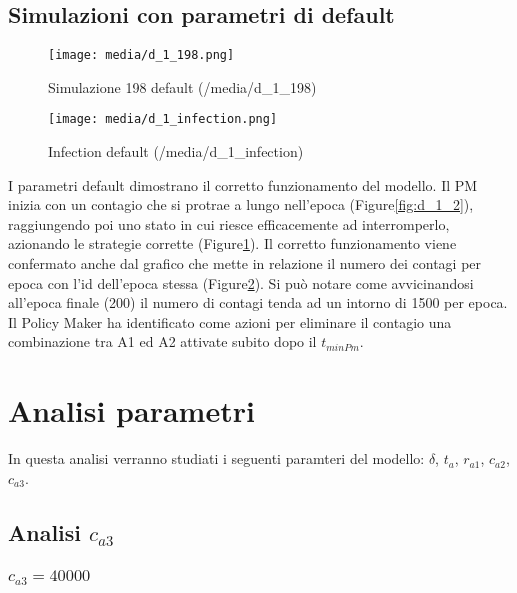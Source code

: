 \documentclass{article}
\begin{document}
{\subsection{Simulazioni con parametri di default}
\begin{figure}[H]
    \texttt{[image: media/d\_1\_198.png]}
    \caption{Simulazione 198 default (/media/d\_1\_198)}
    \label{fig:d_1_198}
\end{figure}
\begin{figure}[H]
    \texttt{[image: media/d\_1\_infection.png]}
    \caption{Infection default (/media/d\_1\_infection)}
    \label{fig:d_1_infection}
\end{figure}
I parametri default dimostrano il corretto funzionamento del modello. Il PM inizia con un contagio che si protrae a lungo nell'epoca (Figure\ref{fig:d_1_2}), raggiungendo poi uno stato in cui riesce efficacemente ad interromperlo, azionando le strategie corrette (Figure\ref{fig:d_1_198}).\newline
Il corretto funzionamento viene confermato anche dal grafico che mette in relazione il numero dei contagi per epoca con l'id dell'epoca stessa (Figure\ref{fig:d_1_infection}). Si può notare come avvicinandosi all'epoca finale (200) il numero di contagi tenda ad un intorno di 1500 per epoca.\newline
Il Policy Maker ha identificato come azioni per eliminare il contagio una combinazione tra A1 ed A2 attivate subito dopo il $t_{minPm}$.



\section{Analisi parametri}

In questa analisi verranno studiati i seguenti paramteri del modello: $\delta$, $t_{a}$, $r_{a1}$, $c_{a2}$, $c_{a3}$.

\subsection{Analisi $c_{a3}$}
\subsubsection{$c_{a3} = 40000$}






\printindex




}
\end{document}
